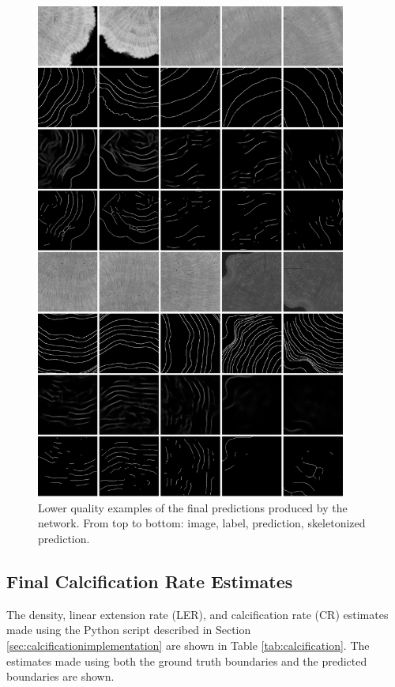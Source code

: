 \begin{figure}[!p]
    \centering
    \includegraphics[width=0.91\textwidth]{images/final-results-bad.png}
    \caption{Lower quality examples of the final predictions produced by the network. From top to bottom: image, label, prediction, skeletonized prediction.}
    \label{fig:finalresultsbad}
\end{figure}

\subsection{Final Calcification Rate Estimates}

The density, linear extension rate (LER), and calcification rate (CR) estimates made using the Python script described in Section \ref{sec:calcificationimplementation} are shown in Table \ref{tab:calcification}. The estimates made using both the ground truth boundaries and the predicted boundaries are shown.


